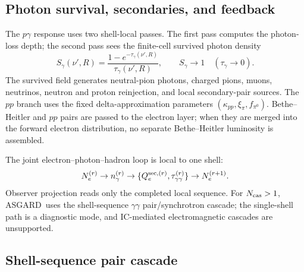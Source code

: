 \documentclass[twocolumn]{aastex702}
\newcommand{\asgard}{\textsc{ASGARD}}
\begin{document}
\subsection{Photon survival, secondaries, and feedback}

The \(p\gamma\) response uses two shell-local passes.  The first pass computes the
photon-loss depth; the second pass sees the finite-cell survived photon density
\begin{equation}
S_\gamma(\nu',R)=\frac{1-e^{-\tau_\gamma(\nu',R)}}{\tau_\gamma(\nu',R)},
\qquad S_\gamma\to1\quad(\tau_\gamma\to0).
\end{equation}
The survived field generates neutral-pion photons, charged pions, muons,
neutrinos, neutron and proton reinjection, and local secondary-pair sources.
The \(pp\) branch uses the fixed delta-approximation parameters
\((\kappa_{pp},\xi_\pi,f_{\pi^0})\).  Bethe--Heitler and \(pp\) pairs are passed
to the electron layer; when they are merged into the forward electron
distribution, no separate Bethe--Heitler luminosity is assembled.

The joint electron--photon--hadron loop is local to one shell:
\begin{equation}
N_e^{(r)}
\rightarrow n_\gamma^{(r)}
\rightarrow \{Q_e^{{\rm sec},(r)},\tau_{\gamma\gamma}^{(r)}\}
\rightarrow N_e^{(r+1)}.
\end{equation}
Observer projection reads only the completed local sequence.  For
\(N_{\rm cas}>1\), \asgard\ uses the shell-sequence
\(\gamma\gamma\) pair/synchrotron cascade; the single-shell path is a diagnostic
mode, and IC-mediated electromagnetic cascades are unsupported.

\subsection{Shell-sequence pair cascade}
\end{document}
